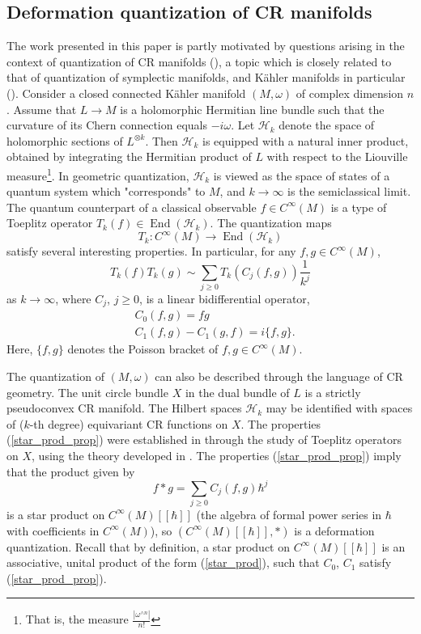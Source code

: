 \documentclass{article}
\newcommand{\mch}{\mathcal H}
\DeclareMathOperator{\End}{End}
\begin{document}
\subsection{Deformation quantization of CR manifolds}\label{motiv_sect}
%
%
The work presented in this paper is partly motivated by questions arising in the context of quantization of CR manifolds (\cite{fitzpatrick, hmm, gh1, gh2, hhms}), a topic which is closely related to that of quantization of symplectic manifolds, and K\"{a}hler manifolds in particular (\cite{bms, charles, mamarinescu, lefloch, schlichenmaier}).
Consider a closed connected K\"{a}hler manifold $(M, \omega)$ of complex dimension $n$. Assume that $L \to M$ is a holomorphic Hermitian line bundle such that the curvature of its Chern connection equals $-i\omega$. Let $\mch_k$ denote the space of holomorphic sections of $L^{\otimes k}$. Then $\mch_k$ is equipped with a natural inner product, obtained by integrating the Hermitian product of $L$ with respect to the Liouville measure\footnote{That is, the measure $\frac{|\omega^{\wedge n}|}{n!}$}. In geometric quantization, $\mch_k$ is viewed as the space of states of a quantum system which "corresponds" to $M$, and $k \to \infty$ is the semiclassical limit. The quantum counterpart of a classical observable $f \in C^\infty(M)$ is a type of Toeplitz operator $T_k(f) \in \End(\mch_k)$. The quantization maps $$T_k : C^\infty(M) \to \End(\mch_k)$$ satisfy several interesting properties. In particular, for any $f, g \in C^\infty(M)$, $$T_k(f) T_k(g) \sim \sum_{j \ge 0} T_k(C_j(f,g)) \frac 1 {k^j}$$
as $k \to \infty$, where $C_j$, $j \ge 0$, is a linear bidifferential operator, \begin{equation}\label{star_prod_prop}\begin{aligned} &C_0(f,g) = fg\\ &C_1(f,g) - C_1(g,f) = i \{f,g\}.\end{aligned}\end{equation}Here, $\{f,g\}$ denotes the Poisson bracket of $f, g \in C^\infty(M)$.
%

The quantization of $(M,\omega)$ can also be described through the language of CR geometry. The unit circle bundle $X$ in the dual bundle of $L$ is a strictly pseudoconvex CR manifold. The Hilbert spaces $\mch_k$ may be identified with spaces of ($k$-th degree) equivariant CR functions on $X$. The properties (\ref{star_prod_prop}) were established in \cite{bms} through the study of Toeplitz operators on $X$, using the theory developed in \cite{bdmg}. The properties  (\ref{star_prod_prop}) imply that the product given by \begin{equation}\label{star_prod}f*g = \sum_{j \ge 0} C_j(f,g)\hbar^j\end{equation}
is a star product on $C^\infty(M)[[\hbar]]$ (the algebra of formal power series in $\hbar$ with coefficients in $C^\infty(M)$), so $\left(C^\infty(M)[[\hbar]], *\right)$ is a deformation quantization. Recall that by definition, a star product on $C^\infty(M)[[\hbar]]$ is an associative, unital product of the form (\ref{star_prod}), such that $C_0$, $C_1$ satisfy (\ref{star_prod_prop}).
%
\end{document}
